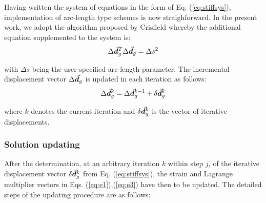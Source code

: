 Having written the system of equations in the form of Eq. (\ref{eq:stiffsys}),
implementation of arc-length type schemes is now straighforward. In the
present
work, we adopt the algorithm proposed by Crisfield \cite{Crisfield3} whereby
the additional equation supplemented to the system is:
\begin{gather}
	\Delta\vec{\bm{d}}_g^T\Delta\vec{\bm{d}}_g = \Delta s^2
\end{gather}

\noindent with $\Delta s$ being the user-specified arc-length 
parameter. The
incremental displacement vector $\Delta\vec{\bm{d}}_g$ is updated in each iteration
as follows:
\begin{gather}
	\Delta\vec{\bm{d}}_g^{k} = \Delta\vec{\bm{d}}_g^{k-1} + \delta\vec{\bm{d}}_g^{k}
\end{gather}

\noindent where $k$ denotes the current iteration and
$\delta\vec{\bm{d}}_g^{k}$ is the vector of iterative displacements.

\subsubsection{Solution updating}\label{subsection:CH2-S4SS4}

After the determination, at an arbitrary iteration $k$ within
step $j$, of the iterative
displacement vector $\delta\vec{\bm{d}}_g^k$ from Eq. (\ref{eq:stiffsys}), the 
strain
and Lagrange multiplier vectors in Eqs. (\ref{eq:e1}),(\ref{eq:e3}) have
then to be updated.  The detailed steps of the updating procedure are as
follows:

\vspace{0.4cm}

